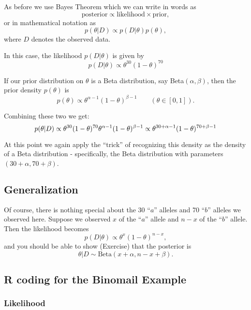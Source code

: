 \documentclass[
]{article}
\begin{document}
As before we use Bayes Theorem which we can write in words as
\[\text{posterior} \propto 
\text{likelihood} \times \text{prior},\] or in mathematical notation as
\[ p(\theta | D) \propto p(D | \theta) p(\theta),\] where \(D\) denotes
the observed data.

In this case, the likelihood \(p(D | \theta)\) is given by
\[p(D | \theta) \propto \theta^{30} (1-\theta)^{70}\]

If our prior distribution on \(\theta\) is a Beta distribution, say
Beta\((\alpha,\beta)\), then the prior density \(p(\theta)\) is
\[p(\theta) \propto \theta^{\alpha-1}(1-\theta)^{\beta-1} \qquad (\theta \in [0,1]).\]

Combining these two we get:
\[p(\theta | D) \propto \theta^{30} (1-\theta)^{70} \theta^{\alpha-1} (1-\theta)^{\beta-1}\\
\propto \theta^{30+\alpha-1}(1-\theta)^{70+\beta-1}\]

At this point we again apply the ``trick'' of recognizing this density
as the density of a Beta distribution - specifically, the Beta
distribution with parameters \((30+\alpha,70+\beta)\).

\hypertarget{generalization}{%
\subsection{Generalization}\label{generalization}}

Of course, there is nothing special about the 30 ``\(a\)'' alleles and
70 ``\(b\)'' alleles we observed here. Suppose we observed \(x\) of the
``\(a\)'' allele and \(n-x\) of the ``\(b\)'' allele. Then the
likelihood becomes
\[p(D | \theta) \propto \theta^{x} (1-\theta)^{n-x},\] and you should be
able to show (Exercise) that the posterior is
\[\theta|D \sim \text{Beta}(x+\alpha, n-x+\beta).\]

\hypertarget{r-coding-for-the-binomail-example}{%
\subsection{R coding for the Binomail
Example}\label{r-coding-for-the-binomail-example}}

\hypertarget{likelihood}{%
\subsubsection{Likelihood}\label{likelihood}}
\end{document}
